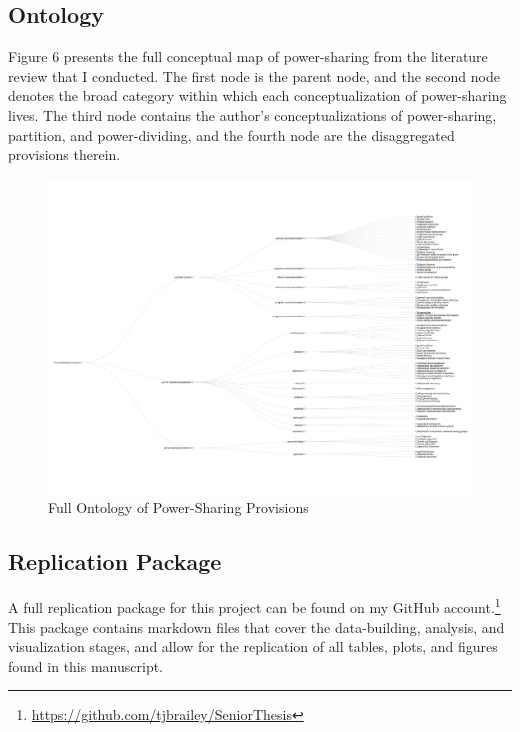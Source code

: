 \documentclass[12pt]{article}
\begin{document}
\subsection{Ontology}

Figure 6 presents the full conceptual map of power-sharing from the literature review that I conducted. The first node is the parent node, and the second node denotes the broad category within which each conceptualization of power-sharing lives. The third node contains the author's conceptualizations of power-sharing, partition, and power-dividing, and the fourth node are the disaggregated provisions therein. 

\begin{figure}
	\includegraphics[width = 9.5in]{psp_ontology_vis.png}
	\caption{Full Ontology of Power-Sharing Provisions}
\end{figure}

\subsection{Replication Package}
A full replication package for this project can be found on my GitHub account.\footnote{\url{https://github.com/tjbrailey/SeniorThesis}} This package contains markdown files that cover the data-building, analysis, and visualization stages, and allow for the replication of all tables, plots, and figures found in this manuscript. 
\end{document}
